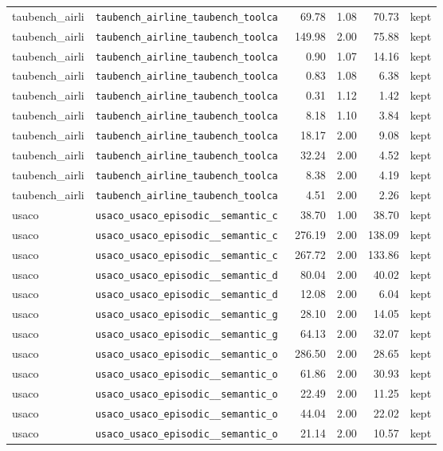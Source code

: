 {\begin{longtable}{llrrrl}
taubench\_airli & \texttt{\scriptsize taubench\_airline\_taubench\_toolca~} & 69.78 & 1.08 & 70.73 & kept \\
taubench\_airli & \texttt{\scriptsize taubench\_airline\_taubench\_toolca~} & 149.98 & 2.00 & 75.88 & kept \\
taubench\_airli & \texttt{\scriptsize taubench\_airline\_taubench\_toolca~} & 0.90 & 1.07 & 14.16 & kept \\
taubench\_airli & \texttt{\scriptsize taubench\_airline\_taubench\_toolca~} & 0.83 & 1.08 & 6.38 & kept \\
taubench\_airli & \texttt{\scriptsize taubench\_airline\_taubench\_toolca~} & 0.31 & 1.12 & 1.42 & kept \\
taubench\_airli & \texttt{\scriptsize taubench\_airline\_taubench\_toolca~} & 8.18 & 1.10 & 3.84 & kept \\
taubench\_airli & \texttt{\scriptsize taubench\_airline\_taubench\_toolca~} & 18.17 & 2.00 & 9.08 & kept \\
taubench\_airli & \texttt{\scriptsize taubench\_airline\_taubench\_toolca~} & 32.24 & 2.00 & 4.52 & kept \\
taubench\_airli & \texttt{\scriptsize taubench\_airline\_taubench\_toolca~} & 8.38 & 2.00 & 4.19 & kept \\
taubench\_airli & \texttt{\scriptsize taubench\_airline\_taubench\_toolca~} & 4.51 & 2.00 & 2.26 & kept \\
usaco & \texttt{\scriptsize usaco\_usaco\_episodic\_\_semantic\_c~} & 38.70 & 1.00 & 38.70 & kept \\
usaco & \texttt{\scriptsize usaco\_usaco\_episodic\_\_semantic\_c~} & 276.19 & 2.00 & 138.09 & kept \\
usaco & \texttt{\scriptsize usaco\_usaco\_episodic\_\_semantic\_c~} & 267.72 & 2.00 & 133.86 & kept \\
usaco & \texttt{\scriptsize usaco\_usaco\_episodic\_\_semantic\_d~} & 80.04 & 2.00 & 40.02 & kept \\
usaco & \texttt{\scriptsize usaco\_usaco\_episodic\_\_semantic\_d~} & 12.08 & 2.00 & 6.04 & kept \\
usaco & \texttt{\scriptsize usaco\_usaco\_episodic\_\_semantic\_g~} & 28.10 & 2.00 & 14.05 & kept \\
usaco & \texttt{\scriptsize usaco\_usaco\_episodic\_\_semantic\_g~} & 64.13 & 2.00 & 32.07 & kept \\
usaco & \texttt{\scriptsize usaco\_usaco\_episodic\_\_semantic\_o~} & 286.50 & 2.00 & 28.65 & kept \\
usaco & \texttt{\scriptsize usaco\_usaco\_episodic\_\_semantic\_o~} & 61.86 & 2.00 & 30.93 & kept \\
usaco & \texttt{\scriptsize usaco\_usaco\_episodic\_\_semantic\_o~} & 22.49 & 2.00 & 11.25 & kept \\
usaco & \texttt{\scriptsize usaco\_usaco\_episodic\_\_semantic\_o~} & 44.04 & 2.00 & 22.02 & kept \\
usaco & \texttt{\scriptsize usaco\_usaco\_episodic\_\_semantic\_o~} & 21.14 & 2.00 & 10.57 & kept \\
\end{longtable}
}
